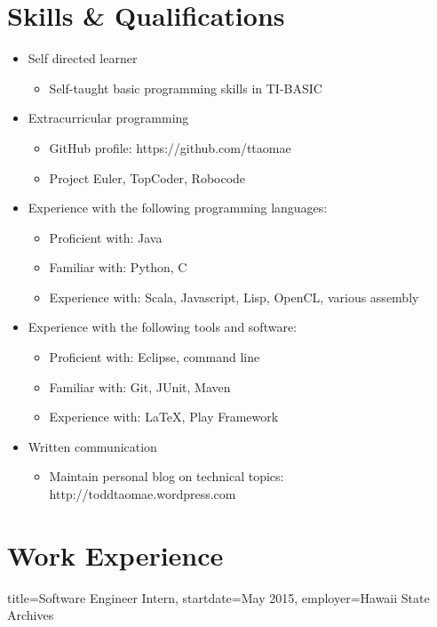 \documentclass{resume}
\begin{document}
\section*{Skills \& Qualifications}
\begin{itemize}
    \item{Self directed learner}
    \begin{itemize}
        \item{Self-taught basic programming skills in TI-BASIC}
    \end{itemize}

    \item{Extracurricular programming}
    \begin{itemize}
        \item{GitHub profile: https://github.com/ttaomae}
        \item{Project Euler, TopCoder, Robocode}
    \end{itemize}

    \item{Experience with the following programming languages:}
    \begin{itemize}
        \item{Proficient with: Java}
        \item{Familiar with: Python, C}
        \item{Experience with: Scala, Javascript, Lisp, OpenCL, various assembly}
    \end{itemize}

    \item{Experience with the following tools and software:}
    \begin{itemize}
        \item{Proficient with: Eclipse, command line}
        \item{Familiar with: Git, JUnit, Maven}
        \item{Experience with: \LaTeX, Play Framework}
    \end{itemize}

    \item{Written communication}
    \begin{itemize}
        \item{Maintain personal blog on technical topics: http://toddtaomae.wordpress.com}
    \end{itemize}
\end{itemize}


\section*{Work Experience}
\begin{job}{title=Software Engineer Intern,
            startdate=May 2015,
            employer=Hawaii State Archives}
\end{job}
\end{document}
